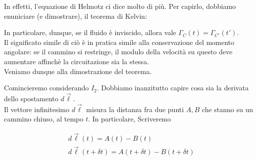 \documentclass{report}
\begin{document}
In effetti, l'equazione di Helmotz ci dice molto di più. Per capirlo, dobbiamo enuniciare (e dimostrare), il teorema di Kelvin:



In particolare, dunque, se il fluido è inviscido, allora vale \(\Gamma_C(t) = \Gamma_{C'}(t')\). \\

Il significato simile di ciò è in pratica simile alla conservazione del momento angolare: se il cammino si restringe, il modulo della velocità su questo deve aumentare affinchè la circuitazione sia la stessa.  \\

Veniamo dunque alla dimostrazione del teorema. 




Comincieremo considerando \(I_2\). Dobbiamo inanzitutto capire cosa sia la derivata dello spostamento \(d\vec{\ell}\). \\

Il vettore infinitesimo \(d\vec{\ell}\) misura la distanza fra due punti \(A, B\) che stanno su un cammino chiuso, al tempo \(t\). In particolare, Scriveremo\

\begin{align}
    &d\vec{\ell}(t) = A(t) - B(t) \\
    &d\vec{\ell}(t + \delta t) = A(t + \delta t) - B(t + \delta t) 
\end{align}
\end{document}
